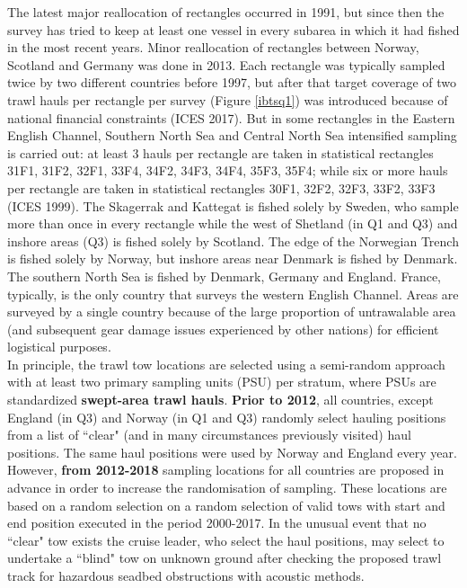 \documentclass[a4paper 12pt]{article}
\numberwithin{equation}{section}
\begin{document}
\indent The latest major reallocation of rectangles occurred in 1991, but since then the survey has tried to keep at least one vessel in every subarea in which it had fished in the most recent years. Minor reallocation of rectangles between Norway, Scotland and Germany was done in 2013. Each rectangle was  typically sampled twice by two different countries before 1997, but after that target coverage of two trawl hauls per rectangle per survey (Figure \ref{ibtsq1}) was introduced because of national financial constraints (ICES 2017). But in some rectangles in the Eastern English Channel, Southern North Sea and Central North Sea intensified sampling is carried out: at least 3 hauls per rectangle are taken in statistical rectangles  31F1, 31F2, 32F1, 33F4, 34F2, 34F3, 34F4, 35F3, 35F4; while six or more hauls per rectangle are taken in statistical rectangles  30F1, 32F2, 32F3, 33F2, 33F3 (ICES 1999).  The Skagerrak and Kattegat is fished solely by Sweden, who sample more than once in every rectangle while the west of Shetland (in Q1 and Q3) and inshore areas (Q3) is fished solely by Scotland. The edge of the Norwegian Trench is fished solely by Norway, but inshore areas near Denmark is fished by Denmark. The southern North Sea is fished by Denmark, Germany and England. France, typically, is the only country that surveys the western English Channel. Areas are surveyed by a single country because of the large proportion of untrawalable area (and subsequent gear damage issues experienced by other nations)  for efficient logistical purposes.\\
\indent In principle, the trawl tow locations are selected using a  semi-random approach with at least two primary sampling units (PSU) per stratum, where PSUs are standardized {\bf swept-area trawl hauls}. {\bf Prior to 2012}, all countries, except England (in Q3) and Norway (in Q1 and Q3) randomly select hauling positions from a list of ``clear" (and in many circumstances previously visited) haul positions. The same haul positions were used by Norway and England every year. However, {\bf from 2012-2018} sampling locations for all countries are proposed in advance in order to increase the randomisation of sampling. These locations are based on a random selection on a random selection of valid tows with start and end position executed in the period 2000-2017. In the unusual event that no ``clear" tow exists the cruise leader, who select the haul positions, may select to undertake a ``blind" tow on unknown ground after checking the proposed trawl track for hazardous seadbed obstructions with acoustic methods. \\
\end{document}

